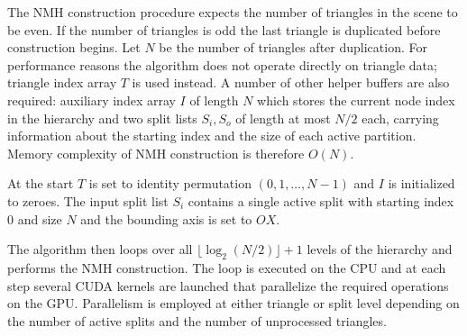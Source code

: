 The NMH construction procedure expects the number of triangles in the scene to be even. If the number of triangles is odd the last triangle is duplicated before construction begins. Let $N$ be the number of triangles after duplication. For performance reasons the algorithm does not operate directly on triangle data; triangle index array $T$ is used instead. A number of other helper buffers are also required: auxiliary index array $I$ of length $N$ which stores the current node index in the hierarchy and two split lists $S_{i}, S_{o}$ of length at most $N/2$ each, carrying information about the starting index and the size of each active partition. Memory complexity of NMH construction is therefore $O(N)$.

At the start $T$ is set to identity permutation $(0, 1, \dots, N-1)$ and $I$ is initialized to zeroes. The input split list $S_{i}$ contains a single active split with starting index $0$ and size $N$ and the bounding axis is set to $OX$.

The algorithm then loops over all $\lfloor \log_{2}(N/2) \rfloor + 1$ levels of the hierarchy and performs the NMH construction. The loop is executed on the CPU and at each step several CUDA kernels are launched that parallelize the required operations on the GPU. Parallelism is employed at either triangle or split level depending on the number of active splits and the number of unprocessed triangles.

